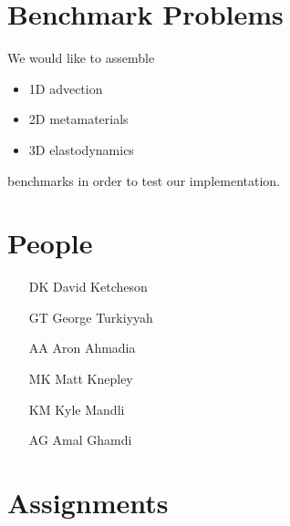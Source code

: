 \documentclass[12pt]{article}
\begin{document}
\section{Benchmark Problems}

We would like to assemble
\begin{itemize}
  \item 1D advection

  \item 2D metamaterials

  \item 3D elastodynamics
\end{itemize}
benchmarks in order to test our implementation.

\section{People}
\begin{itemize}
  \item[DK] David Ketcheson

  \item[GT] George Turkiyyah

  \item[AA] Aron Ahmadia

  \item[MK] Matt Knepley

  \item[KM] Kyle Mandli

  \item[AG] Amal Ghamdi
\end{itemize}

\section{Assignments}
\end{document}
